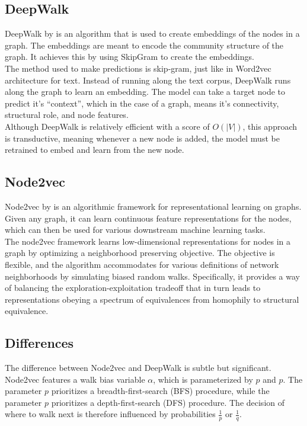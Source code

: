 \documentclass[sigconf]{acmart}
\begin{document}
\subsection{DeepWalk}

DeepWalk by \citet{Perozzi:2014:DOL:2623330.2623732} is an algorithm that is used to create embeddings of the nodes in a graph. The embeddings are meant to encode the community structure of the graph. It achieves this by using SkipGram to create the embeddings.
\\
The method used to make predictions is skip-gram, just like in Word2vec architecture for text. Instead of running along the text corpus, DeepWalk runs along the graph to learn an embedding. The model can take a target node to predict it’s “context”, which in the case of a graph, means it’s connectivity, structural role, and node features.
\\
Although DeepWalk is relatively efficient with a score of \textbf{$O(|V|)$}, this approach is transductive, meaning whenever a new node is added, the model must be retrained to embed and learn from the new node.

\subsection{Node2vec}

Node2vec by \citet{node2vec-kdd2016} is an algorithmic framework for representational learning on graphs. Given any graph, it can learn continuous feature representations for the nodes, which can then be used for various downstream machine learning tasks. \\
The node2vec framework learns low-dimensional representations for nodes in a graph by optimizing a neighborhood preserving objective. The objective is flexible, and the algorithm accommodates for various definitions of network neighborhoods by simulating biased random walks. Specifically, it provides a way of balancing the exploration-exploitation tradeoff that in turn leads to representations obeying a spectrum of equivalences from homophily to structural equivalence.

\subsection{Differences}

The difference between Node2vec and DeepWalk is subtle but significant. Node2vec features a walk bias variable $\alpha$, which is parameterized by $p$ and $p$. The parameter $p$ prioritizes a breadth-first-search (BFS) procedure, while the parameter $p$ prioritizes a depth-first-search (DFS) procedure. The decision of where to walk next is therefore influenced by probabilities $\frac{1}{p}$ or $\frac{1}{q}$. \\
\end{document}
